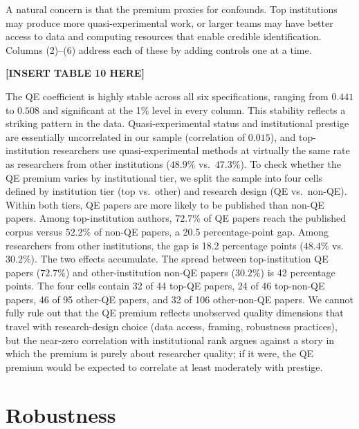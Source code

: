 \documentclass[12pt]{article}
\begin{document}
A natural concern is that the premium proxies for confounds.  Top
institutions may produce more quasi-experimental work, or larger
teams may have better access to data and computing resources that
enable credible identification.  Columns (2)--(6) address each of
these by adding controls one at a time.


\begin{center}
\textbf{[INSERT TABLE 10 HERE]}
\end{center}

The QE coefficient is highly stable across all six specifications,
ranging from $0.441$ to $0.508$ and significant at the 1\% level in
every column.  This stability reflects a striking pattern in the
data.  Quasi-experimental status and institutional prestige are
essentially uncorrelated in our sample (correlation of $0.015$), and
top-institution researchers use quasi-experimental methods at
virtually the same rate as researchers from other institutions
($48.9\%$ vs.\ $47.3\%$).  To check whether the QE premium varies by
institutional tier, we split the sample into four cells defined by
institution tier (top vs.\ other) and research design (QE vs.\
non-QE).  Within both tiers, QE papers are more likely to be
published than non-QE papers.  Among top-institution authors,
$72.7\%$ of QE papers reach the published corpus versus $52.2\%$ of
non-QE papers, a 20.5 percentage-point gap.  Among researchers from
other institutions, the gap is 18.2 percentage points ($48.4\%$
vs.\ $30.2\%$).  The two effects accumulate.  The spread between
top-institution QE papers ($72.7\%$) and other-institution non-QE
papers ($30.2\%$) is 42 percentage points.  The four cells contain
32 of 44 top-QE papers, 24 of 46 top-non-QE papers, 46 of 95
other-QE papers, and 32 of 106 other-non-QE papers.  We cannot
fully rule out that the QE premium reflects unobserved quality
dimensions that travel with research-design choice (data access,
framing, robustness practices), but the near-zero correlation with
institutional rank argues against a story in which the premium is
purely about researcher quality; if it were, the QE premium would
be expected to correlate at least moderately with prestige.

\section{Robustness}
\label{sec:robustness}
\end{document}
